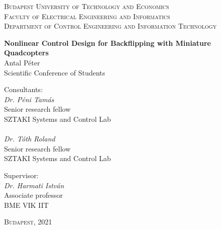 \begin{center}
{\textsc{Budapest University of Technology and Economics\\Faculty of Electrical Engineering and Informatics\\Department of Control Engineering and Information Technology}}


{\Large\textbf{Nonlinear Control Design for Backflipping with Miniature Quadcopters\\}}
{\Large{Antal Péter\\}}
{\large{Scientific Conference of Students\\}}
\end{center}



\begin{minipage}[t]{0.52\linewidth}
Consultants:\\
\forceindent \textit{Dr. Péni Tamás}\\
\forceindent Senior research fellow\\
\forceindent SZTAKI Systems and Control Lab\\
\phantom{o}\\
\forceindent \textit{Dr. Tóth Roland}\\
\forceindent Senior research fellow\\
\forceindent SZTAKI Systems and Control Lab
\end{minipage}\begin{minipage}[t]{0.48\linewidth}
Supervisor:\\
\forceindent \textit{Dr. Harmati István}\\
\forceindent Associate professor\\
\forceindent BME VIK IIT
\end{minipage} 


		
\begin{center}
{\large\textsc{Budapest, }2021 }
\end{center}
